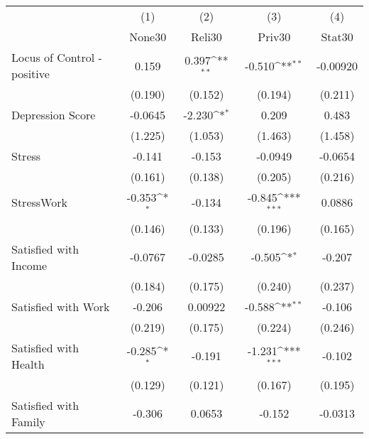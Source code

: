 {
\def\sym#1{\ifmmode^{#1}\else\(^{#1}\)\fi}
\begin{tabular}{l*{4}{c}}
\hline\hline
            &\multicolumn{1}{c}{(1)}&\multicolumn{1}{c}{(2)}&\multicolumn{1}{c}{(3)}&\multicolumn{1}{c}{(4)}\\
            &\multicolumn{1}{c}{None30}&\multicolumn{1}{c}{Reli30}&\multicolumn{1}{c}{Priv30}&\multicolumn{1}{c}{Stat30}\\
\hline
Locus of Control - positive&       0.159         &       0.397\sym{**} &      -0.510\sym{**} &    -0.00920         \\
            &     (0.190)         &     (0.152)         &     (0.194)         &     (0.211)         \\
[1em]
Depression Score&     -0.0645         &      -2.230\sym{*}  &       0.209         &       0.483         \\
            &     (1.225)         &     (1.053)         &     (1.463)         &     (1.458)         \\
[1em]
Stress      &      -0.141         &      -0.153         &     -0.0949         &     -0.0654         \\
            &     (0.161)         &     (0.138)         &     (0.205)         &     (0.216)         \\
[1em]
StressWork  &      -0.353\sym{*}  &      -0.134         &      -0.845\sym{***}&      0.0886         \\
            &     (0.146)         &     (0.133)         &     (0.196)         &     (0.165)         \\
[1em]
Satisfied with Income&     -0.0767         &     -0.0285         &      -0.505\sym{*}  &      -0.207         \\
            &     (0.184)         &     (0.175)         &     (0.240)         &     (0.237)         \\
[1em]
Satisfied with Work&      -0.206         &     0.00922         &      -0.588\sym{**} &      -0.106         \\
            &     (0.219)         &     (0.175)         &     (0.224)         &     (0.246)         \\
[1em]
Satisfied with Health&      -0.285\sym{*}  &      -0.191         &      -1.231\sym{***}&      -0.102         \\
            &     (0.129)         &     (0.121)         &     (0.167)         &     (0.195)         \\
[1em]
Satisfied with Family&      -0.306         &      0.0653         &      -0.152         &     -0.0313         \\

\end{tabular}}
